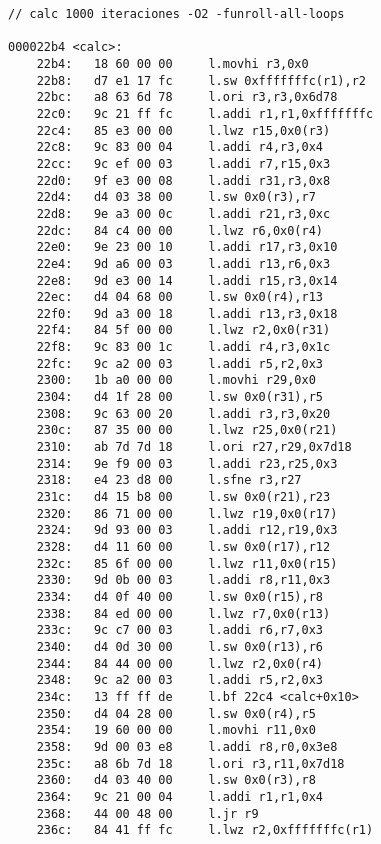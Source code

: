 \begin{lstlisting}[frame=single]
// calc 1000 iteraciones -O2 -funroll-all-loops

000022b4 <calc>:
    22b4:	18 60 00 00 	l.movhi r3,0x0
    22b8:	d7 e1 17 fc 	l.sw 0xfffffffc(r1),r2
    22bc:	a8 63 6d 78 	l.ori r3,r3,0x6d78
    22c0:	9c 21 ff fc 	l.addi r1,r1,0xfffffffc
    22c4:	85 e3 00 00 	l.lwz r15,0x0(r3)
    22c8:	9c 83 00 04 	l.addi r4,r3,0x4
    22cc:	9c ef 00 03 	l.addi r7,r15,0x3
    22d0:	9f e3 00 08 	l.addi r31,r3,0x8
    22d4:	d4 03 38 00 	l.sw 0x0(r3),r7
    22d8:	9e a3 00 0c 	l.addi r21,r3,0xc
    22dc:	84 c4 00 00 	l.lwz r6,0x0(r4)
    22e0:	9e 23 00 10 	l.addi r17,r3,0x10
    22e4:	9d a6 00 03 	l.addi r13,r6,0x3
    22e8:	9d e3 00 14 	l.addi r15,r3,0x14
    22ec:	d4 04 68 00 	l.sw 0x0(r4),r13
    22f0:	9d a3 00 18 	l.addi r13,r3,0x18
    22f4:	84 5f 00 00 	l.lwz r2,0x0(r31)
    22f8:	9c 83 00 1c 	l.addi r4,r3,0x1c
    22fc:	9c a2 00 03 	l.addi r5,r2,0x3
    2300:	1b a0 00 00 	l.movhi r29,0x0
    2304:	d4 1f 28 00 	l.sw 0x0(r31),r5
    2308:	9c 63 00 20 	l.addi r3,r3,0x20
    230c:	87 35 00 00 	l.lwz r25,0x0(r21)
    2310:	ab 7d 7d 18 	l.ori r27,r29,0x7d18
    2314:	9e f9 00 03 	l.addi r23,r25,0x3
    2318:	e4 23 d8 00 	l.sfne r3,r27
    231c:	d4 15 b8 00 	l.sw 0x0(r21),r23
    2320:	86 71 00 00 	l.lwz r19,0x0(r17)
    2324:	9d 93 00 03 	l.addi r12,r19,0x3
    2328:	d4 11 60 00 	l.sw 0x0(r17),r12
    232c:	85 6f 00 00 	l.lwz r11,0x0(r15)
    2330:	9d 0b 00 03 	l.addi r8,r11,0x3
    2334:	d4 0f 40 00 	l.sw 0x0(r15),r8
    2338:	84 ed 00 00 	l.lwz r7,0x0(r13)
    233c:	9c c7 00 03 	l.addi r6,r7,0x3
    2340:	d4 0d 30 00 	l.sw 0x0(r13),r6
    2344:	84 44 00 00 	l.lwz r2,0x0(r4)
    2348:	9c a2 00 03 	l.addi r5,r2,0x3
    234c:	13 ff ff de 	l.bf 22c4 <calc+0x10>
    2350:	d4 04 28 00 	l.sw 0x0(r4),r5
    2354:	19 60 00 00 	l.movhi r11,0x0
    2358:	9d 00 03 e8 	l.addi r8,r0,0x3e8
    235c:	a8 6b 7d 18 	l.ori r3,r11,0x7d18
    2360:	d4 03 40 00 	l.sw 0x0(r3),r8
    2364:	9c 21 00 04 	l.addi r1,r1,0x4
    2368:	44 00 48 00 	l.jr r9
    236c:	84 41 ff fc 	l.lwz r2,0xfffffffc(r1)
	\end{lstlisting}

